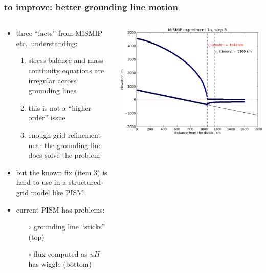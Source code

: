 \documentclass[hide notes,intlimits]{beamer}
\begin{document}
\begin{frame}
  \frametitle{to improve: better grounding line motion}
\begin{columns}
\begin{column}{0.6\textwidth}
  \begin{itemize}
  \item three ``facts'' from MISMIP etc.~understanding:
    \begin{enumerate}
    \item stress balance and mass continuity equations are irregular across grounding lines
    \item this is not a ``higher order'' issue
    \item enough grid refinement near the grounding line does solve the problem
    \end{enumerate}
  \item but the known fix (item 3) is hard to use in a structured-grid model like PISM
  \item current PISM has problems:
    \begin{itemize}
    \item[$\circ$] grounding line ``sticks'' (top)
    \item[$\circ$] flux computed as $u H$ has wiggle (bottom)
    \end{itemize}
  \end{itemize}
\end{column}

\begin{column}{0.4\textwidth}
  \begin{center}
    \includegraphics[width=1.0\textwidth]{A3}


\end{center}
\end{column}
\end{columns}
\end{frame}
\end{document}
